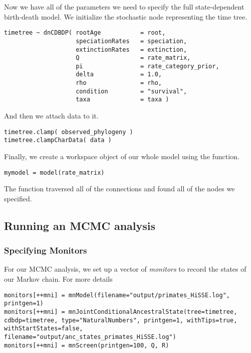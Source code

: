 Now we have all of the parameters we need to specify the full state-dependent birth-death model. 
We initialize the stochastic node representing the time tree.
{\tt \begin{snugshade*}
\begin{lstlisting}
timetree ~ dnCDBDP( rootAge           = root,
                    speciationRates   = speciation,
                    extinctionRates   = extinction, 
                    Q                 = rate_matrix,
                    pi                = rate_category_prior,
                    delta             = 1.0,
                    rho               = rho,
                    condition         = "survival",
                    taxa              = taxa )
\end{lstlisting}
\end{snugshade*}}
And then we attach data to it.
{\tt \begin{snugshade*}
\begin{lstlisting}
timetree.clamp( observed_phylogeny )
timetree.clampCharData( data )
\end{lstlisting}
\end{snugshade*}}

Finally, we create a workspace object of our whole model using the  function. 
{\tt \begin{snugshade*}
\begin{lstlisting}
mymodel = model(rate_matrix)
\end{lstlisting}
\end{snugshade*}}

The  function traversed all of the connections and found all of the nodes we specified. 


\subsection{Running an MCMC analysis}

\subsubsection{Specifying Monitors}

For our MCMC analysis, we set up a vector of \emph{monitors} to record the states of our Markov chain. 
For more details 
{\tt \begin{snugshade*}
\begin{lstlisting}
monitors[++mni] = mnModel(filename="output/primates_HiSSE.log", printgen=1)
monitors[++mni] = mnJointConditionalAncestralState(tree=timetree, cdbdp=timetree, type="NaturalNumbers", printgen=1, withTips=true, withStartStates=false, filename="output/anc_states_primates_HiSSE.log")
monitors[++mni] = mnScreen(printgen=100, Q, R)
\end{lstlisting}
\end{snugshade*}}

